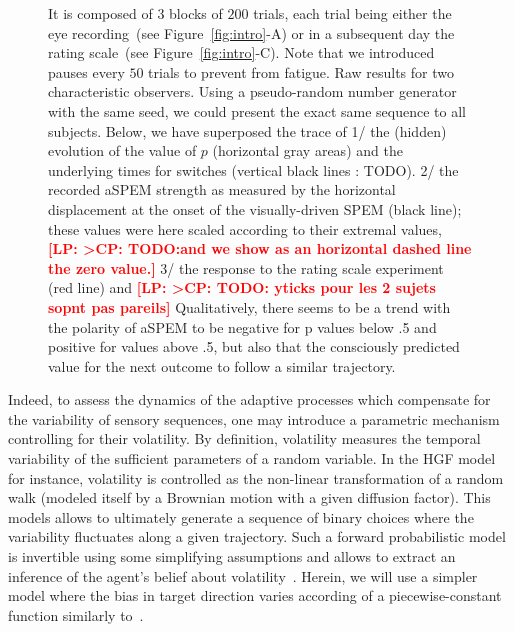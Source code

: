 \documentclass[profile,final,english,draft]{article}%
\newcommand{\citep}[1]{\parencite{#1}}
\newcommand{\citet}[1]{\textcite{#1}}
\newcommand{\seeFig}[1]{Figure~\ref{fig:#1}}
\newcommand{\LP}[1]{\textbf{\textcolor{red}{[LP: #1]}}}
\begin{document}
\begin{figure}
{It is composed of 3 blocks of $200$ trials,
each trial being either the eye recording~(see \seeFig{intro}-A)
or in a subsequent day the rating scale~(see \seeFig{intro}-C).
Note that we introduced pauses every $50$ trials to prevent from fatigue.
Raw results for two characteristic observers.
Using a pseudo-random number generator with the same seed,
we could present the exact same sequence to all subjects. %
Below, we have superposed the trace of
1/ the (hidden) evolution of the value of $p$ (horizontal gray areas)
and the underlying times for switches (vertical black lines : TODO).
2/ the recorded aSPEM strength as measured by the horizontal displacement
at the onset of the visually-driven SPEM (black line);
these values were here scaled according to their extremal values,
\LP{>CP: TODO:and we show as an horizontal dashed line the zero value.}
3/ the response to the rating scale experiment (red line) and
\LP{>CP: TODO: yticks pour les 2 sujets sopnt pas pareils}
Qualitatively, there seems to be a trend with the polarity of aSPEM
to be negative for p values below .5 and positive for values above .5,
but also that the consciously predicted value
for the next outcome
to follow a similar trajectory.
}
\label{fig:results_raw}
\end{figure}
Indeed, to assess the dynamics of the adaptive processes
which compensate for the variability of sensory sequences,
one may introduce a parametric mechanism controlling for their volatility.
By definition, volatility measures the temporal variability
of the sufficient parameters of a random variable.
In the HGF model~\citep{Mathys11} for instance,
volatility is controlled as the non-linear transformation
of a random walk (modeled itself by a Brownian motion with a given diffusion factor).
This models allows to ultimately generate a sequence of binary choices
where the variability fluctuates along a given trajectory.
Such a forward probabilistic model is invertible
using some simplifying assumptions and allows
to extract an inference of the agent's belief about volatility~\citep{Vossel14}.
Herein, we will use a simpler model where
the bias in target direction varies according of a piecewise-constant function
similarly to~\citet{Meyniel13}.
\end{document}
